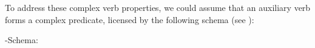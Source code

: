 \documentclass[output=paper
	        ,collection
	        ,collectionchapter
 	        ,biblatex
                ,babelshorthands
                ,newtxmath
                ,draftmode
                ,colorlinks, citecolor=brown
]{langscibook}
\begin{document}
{\begin{exe}
\begin{xlist}
\begin{exe}
\begin{xlist}
To address these complex verb properties, we could assume that
an auxiliary verb forms a complex predicate, licensed by
the following schema (see \citealt{Bratt:96, Chung:98,Kim:16}):


\ea
\label{negation-hd-lex-cxt}
\head-\LIGHT Schema:\\
\z


\end{xlist}
\end{exe}
\end{xlist}
\end{exe}}
\end{document}
